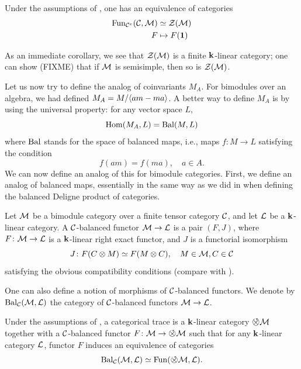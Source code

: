 \begin{lemma}\label{l:cat-center-functor}
  Under the assumptions of ,
  one has an equivalence of categories
  \begin{align*}
  \operatorname{Fun}_{\mathcal{C}^e}(\mathcal{C}, \mathcal{M})&\simeq\mathcal{Z}(\mathcal{M})\\
    F&\mapsto F(\mathbf{1})
  \end{align*}
\end{lemma}

As an immediate corollary, we see that $\mathcal{Z}(\mathcal{M})$ is a finite $\mathbf{k}$-linear
category; one can show (FIXME) that if $\mathcal{M}$ is semisimple, then so is
$\mathcal{Z}(\mathcal{M})$.

Let us now try to define the analog of coinvariants $M_A$. For bimodules over
an algebra, we had defined $M_A=M/\langle am-ma\rangle$. A better way to define $M_A$ is
by using the universal property: for any vector space $L$,
$$
  \operatorname{Hom}(M_A,L)=\operatorname{Bal}(M,L)
$$
where $\operatorname{Bal}$ stands for the space of balanced maps, i.e., maps $f\colon M\to L$
satisfying the condition
$$
  f(am)=f(ma), \quad a\in A.
$$
We can now define an analog of this for bimodule categories. First, we define an
analog of balanced maps, essentially in the same way as we did in
 when defining the balanced Deligne product of
categories.

\begin{definition}\label{d:balanced2}
  Let $\mathcal{M}$ be a bimodule category over a finite tensor category $\mathcal{C}$,
  and let $\mathcal{L}$ be a $\mathbf{k}$-linear category. A $\mathcal{C}$-balanced functor
  $\mathcal{M}\to\mathcal{L}$ is a pair $(F,J)$, where $F\colon \mathcal{M}\to\mathcal{L}$ is a
  $\mathbf{k}$-linear right exact functor, and $J$ is a functorial isomorphism
  $$
    J\colon F(C\otimes M)\simeq F(M\otimes C), \quad M\in \mathcal{M}, C\in \mathcal{C}
  $$
  satisfying the obvious compatibility conditions (compare with
  ).
\end{definition}

One can also define a notion of morphisms of $\mathcal{C}$-balanced functors. We
denote by $\operatorname{Bal}_{\mathcal{C}}(\mathcal{M}, \mathcal{L})$ the category of
$\mathcal{C}$-balanced functors $\mathcal{M}\to \mathcal{L}$.


\begin{definition}\label{d:cat-trace}
  Under the assumptions of , a categorical trace is a
  $\mathbf{k}$-linear category $\circtensor\calM$ together with a
  $\mathcal{C}$-balanced functor $F\colon \calM\to \circtensor \calM$
  such that for any $\mathbf{k}$-linear category
  $\mathcal{L}$, functor $F$ induces an equivalence of categories
  $$
    \Bal_\calC(\calM, \calL)\simeq
    \Fun(\circtensor \calM, \calL).
  $$
\end{definition}

